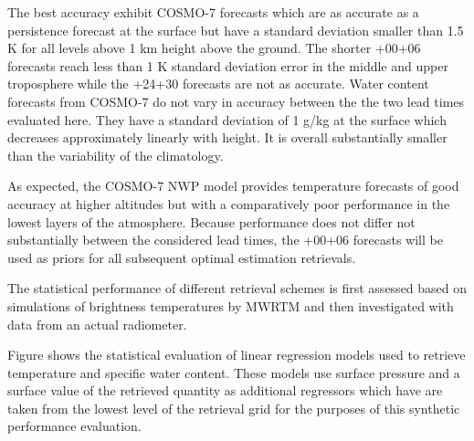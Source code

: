     The best accuracy exhibit COSMO-7 forecasts which are as accurate as
    a persistence forecast at the surface but have a standard deviation smaller
    than 1.5 K for all levels above 1 km height above the ground. The shorter
    +00+06 forecasts reach less than 1 K standard deviation error in the middle
    and upper troposphere while the +24+30 forecasts are not as accurate.
    Water content forecasts from COSMO-7 do not vary in accuracy between the
    the two lead times evaluated here. They have a standard deviation of 1 g/kg
    at the surface which decreases approximately linearly with height. It is
    overall substantially smaller than the variability of the climatology.

    As expected, the COSMO-7 NWP model provides temperature forecasts of good
    accuracy at higher altitudes but with a comparatively poor performance in
    the lowest layers of the atmosphere. Because performance does not differ
    not substantially between the considered lead times, the +00+06 forecasts
    will be used as priors for all subsequent optimal estimation retrievals.

        {}

\stopsection


\startsection[title={Statistical Retrieval Performance}]

    The statistical performance of different retrieval schemes is first
    assessed based on simulations of brightness temperatures by MWRTM and then
    investigated with data from an actual radiometer.

\startsubsection[title={Linear Regression Retrievals}]

    Figure  shows the statistical evaluation of linear
    regression models used to retrieve temperature and specific water content.
    These models use surface pressure and a surface value of the retrieved
    quantity as additional regressors which have are taken from the lowest
    level of the retrieval grid for the purposes of this synthetic performance
    evaluation.

